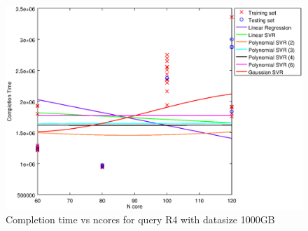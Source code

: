 
\begin {figure}[hbtp]
\centering
\includegraphics[width=\textwidth]{output/R4_1000_LINEAR_NCORE/plot_R4_1000.eps}
\caption{Completion time vs ncores for query R4 with datasize 1000GB}
\label{fig:coreonly_linear_R4_1000}
\end {figure}
